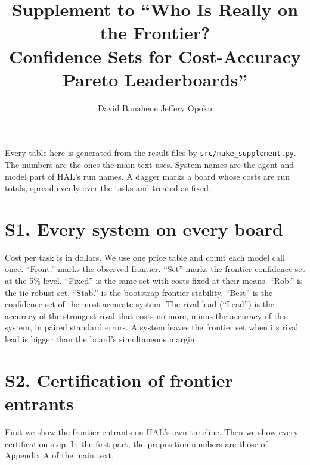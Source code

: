 \documentclass[10pt]{article}
\title{Supplement to ``Who Is Really on the Frontier?\\Confidence Sets for Cost-Accuracy Pareto Leaderboards''}
\author{David Banahene \quad Jeffery Opoku}
\date{}
\begin{document}
\maketitle
\small

Every table here is generated from the result files by \texttt{src/make\_supplement.py}. The numbers are the ones the main text uses. System names are the agent-and-model part of HAL's run names. A dagger marks a board whose costs are run totals, spread evenly over the tasks and treated as fixed.

\section*{S1. Every system on every board}
Cost per task is in dollars. We use one price table and count each model call once. ``Front.'' marks the observed frontier. ``Set'' marks the frontier confidence set at the 5\% level. ``Fixed'' is the same set with costs fixed at their means. ``Rob.'' is the tie-robust set. ``Stab.'' is the bootstrap frontier stability. ``Best'' is the confidence set of the most accurate system. The rival lead (``Lead'') is the accuracy of the strongest rival that costs no more, minus the accuracy of this system, in paired standard errors. A system leaves the frontier set when its rival lead is bigger than the board's simultaneous margin.


\section*{S2. Certification of frontier entrants}
First we show the frontier entrants on HAL's own timeline. Then we show every certification step. In the first part, the proposition numbers are those of Appendix A of the main text.
\end{document}
